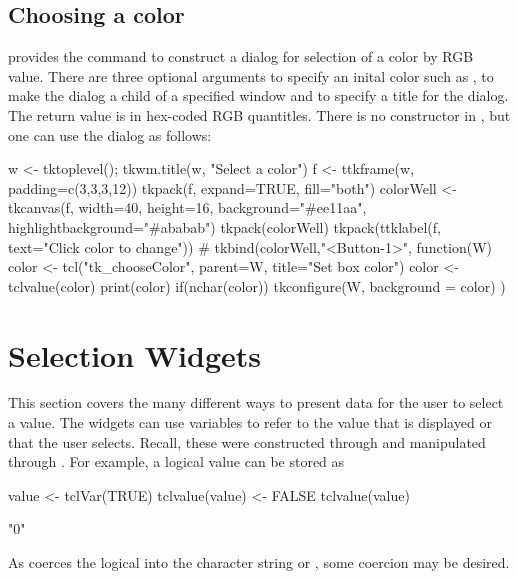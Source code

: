 \subsection{Choosing a color}
\Tk\/ provides the command  to construct a dialog for selection of a color by RGB value. There are three optional arguments  to specify an inital color such as ,  to make the dialog a child of a specified window and  to specify a title for the dialog. The return value is in hex-coded RGB quantitles. 
There is no constructor in , but one can use the dialog as follows:
\begin{Schunk}
\begin{Sinput}
 w <- tktoplevel(); tkwm.title(w, "Select a color")
 f <- ttkframe(w, padding=c(3,3,3,12))
 tkpack(f, expand=TRUE, fill="both")
 colorWell <- tkcanvas(f, width=40, height=16, 
                       background="#ee11aa",
                       highlightbackground="#ababab") 
 tkpack(colorWell)
 tkpack(ttklabel(f, text="Click color to change"))
 #
 tkbind(colorWell,"<Button-1>", function(W) {
   color <- tcl("tk_chooseColor", parent=W, 
                title="Set box color")
   color <- tclvalue(color)
   print(color)
   if(nchar(color))
     tkconfigure(W, background = color)
 })
\end{Sinput}
\end{Schunk}



\section{Selection Widgets}
\label{sec:tcltk:selection-widgets}

This section covers the many different ways to present data for the
user to select a value. The widgets can use \TCL\/ variables to refer
to the value that is displayed or that the user selects.  Recall,
these were constructed through  and manipulated
through .  For example, a logical value can be stored as
\begin{Schunk}
\begin{Sinput}
 value <- tclVar(TRUE)
 tclvalue(value) <- FALSE
 tclvalue(value)
\end{Sinput}
\begin{Soutput}
[1] "0"
\end{Soutput}
\end{Schunk}
As  coerces the logical into the  character string   or , some coercion may be desired.



